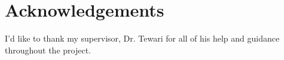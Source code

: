 \chapter*{Acknowledgements}

I'd like to thank my supervisor, Dr. Tewari for all of his help and guidance throughout the project.

